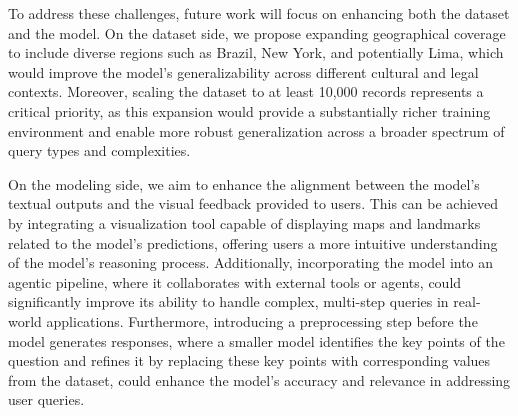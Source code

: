 To address these challenges, future work will focus on enhancing both the dataset and the model. On the dataset side, we propose expanding geographical coverage to include diverse regions such as Brazil, New York, and potentially Lima, which would improve the model's generalizability across different cultural and legal contexts. Moreover, scaling the dataset to at least 10,000 records represents a critical priority, as this expansion would provide a substantially richer training environment and enable more robust generalization across a broader spectrum of query types and complexities.

On the modeling side, we aim to enhance the alignment between the model’s textual outputs and the visual feedback provided to users. This can be achieved by integrating a visualization tool capable of displaying maps and landmarks related to the model's predictions, offering users a more intuitive understanding of the model’s reasoning process. Additionally, incorporating the model into an agentic pipeline, where it collaborates with external tools or agents, could significantly improve its ability to handle complex, multi-step queries in real-world applications. Furthermore, introducing a preprocessing step before the model generates responses, where a smaller model identifies the key points of the question and refines it by replacing these key points with corresponding values from the dataset, could enhance the model's accuracy and relevance in addressing user queries.



